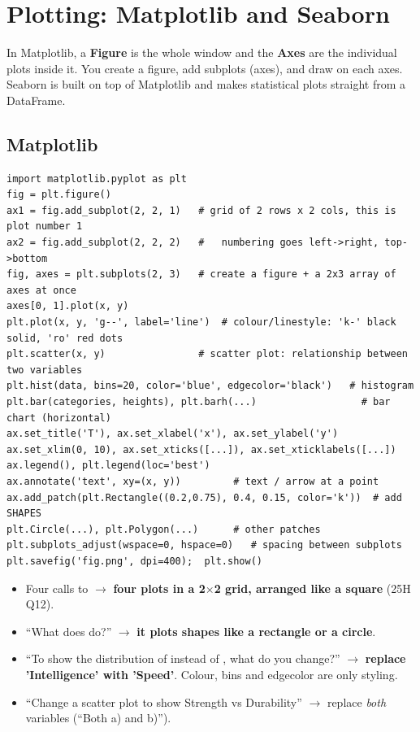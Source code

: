 \newpage
\section{Plotting: Matplotlib and Seaborn}

\begin{idea}
In Matplotlib, a \textbf{Figure} is the whole window and the \textbf{Axes} are the individual plots inside it. You create a figure, add subplots (axes), and draw on each axes.
Seaborn is built on top of Matplotlib and makes statistical plots straight from a DataFrame.
\end{idea}

\subsection{Matplotlib}
\begin{codebox}
\begin{Verbatim}
import matplotlib.pyplot as plt
fig = plt.figure()
ax1 = fig.add_subplot(2, 2, 1)   # grid of 2 rows x 2 cols, this is plot number 1
ax2 = fig.add_subplot(2, 2, 2)   #   numbering goes left->right, top->bottom
fig, axes = plt.subplots(2, 3)   # create a figure + a 2x3 array of axes at once
axes[0, 1].plot(x, y)
plt.plot(x, y, 'g--', label='line')  # colour/linestyle: 'k-' black solid, 'ro' red dots
plt.scatter(x, y)                # scatter plot: relationship between two variables
plt.hist(data, bins=20, color='blue', edgecolor='black')   # histogram
plt.bar(categories, heights), plt.barh(...)                  # bar chart (horizontal)
ax.set_title('T'), ax.set_xlabel('x'), ax.set_ylabel('y')
ax.set_xlim(0, 10), ax.set_xticks([...]), ax.set_xticklabels([...])
ax.legend(), plt.legend(loc='best')
ax.annotate('text', xy=(x, y))         # text / arrow at a point
ax.add_patch(plt.Rectangle((0.2,0.75), 0.4, 0.15, color='k'))  # add SHAPES
plt.Circle(...), plt.Polygon(...)      # other patches
plt.subplots_adjust(wspace=0, hspace=0)   # spacing between subplots
plt.savefig('fig.png', dpi=400);  plt.show()
\end{Verbatim}
\end{codebox}
\begin{exam}
\begin{itemize}
  \item Four calls  to  $\to$ \textbf{four plots in a 2$\times$2 grid, arranged like a square} (25H Q12).
  \item ``What does  do?'' $\to$ \textbf{it plots shapes like a rectangle or a circle}.
  \item ``To show the distribution of  instead of , what do you change?'' $\to$ \textbf{replace 'Intelligence' with 'Speed'}. Colour, bins and edgecolor are only styling.
  \item ``Change a scatter plot to show Strength vs Durability'' $\to$ replace \emph{both} variables (``Both a) and b)'').
\end{itemize}
\end{exam}

